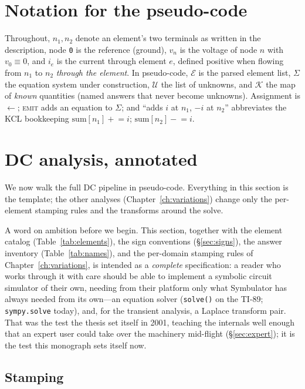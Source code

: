 \documentclass[11pt,oneside]{report}
\newcommand{\kw}[1]{\textsc{#1}}
\newcommand{\code}[1]{\texttt{#1}}
\begin{document}
\section{Notation for the pseudo-code}

Throughout, $n_1, n_2$ denote an element's two terminals as written in
the description, node \code{0} is the reference (ground), $v_n$ is the
voltage of node $n$ with $v_0 \equiv 0$, and $i_e$ is the current
through element $e$, defined positive when flowing from $n_1$ to $n_2$
\emph{through the element}. In pseudo-code, $\mathcal{E}$ is the
parsed element list, $\Sigma$ the equation system under construction,
$\mathcal{U}$ the list of unknowns, and $\mathcal{K}$ the map of
\emph{known} quantities (named answers that never become unknowns).
Assignment is $\gets$; \kw{emit} adds an equation to $\Sigma$; and
``adds $i$ at $n_1$, $-i$ at $n_2$'' abbreviates the KCL bookkeeping
$\mathrm{sum}[n_1] \mathrel{+}= i$;
$\mathrm{sum}[n_2] \mathrel{-}= i$.

\section{DC analysis, annotated}
\label{sec:dc}

We now walk the full DC pipeline in pseudo-code. Everything in this
section is the template; the other analyses (Chapter~\ref{ch:variations})
change only the per-element stamping rules and the transforms around
the solve.

A word on ambition before we begin. This section, together with the
element catalog (Table~\ref{tab:elements}), the sign conventions
(\S\ref{sec:signs}), the answer inventory (Table~\ref{tab:names}),
and the per-domain stamping rules of Chapter~\ref{ch:variations}, is
intended as a \emph{complete} specification: a reader who works
through it with care should be able to implement a symbolic circuit
simulator of their own, needing from their platform only what
Symbulator has always needed from its own---an equation solver
(\code{solve()} on the TI-89; \code{sympy.solve} today), and, for
the transient analysis, a Laplace transform pair. That was the test
the thesis set itself in 2001, teaching the internals well enough
that an expert user could take over the machinery mid-flight
(\S\ref{sec:expert}); it is the test this monograph sets itself now.

\subsection{Stamping}
\end{document}

